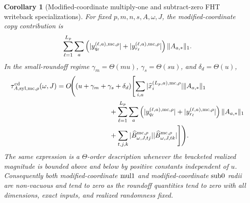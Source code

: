 \documentclass[11pt]{article}
\newtheorem{corollary}[theorem]{Corollary}
\theoremstyle{remark}
\begin{document}
\begin{corollary}[Modified-coordinate multiply-one and subtract-zero FHT writeback specializations]
For fixed \(p,m,n,s,A,\omega,J\), the modified-coordinate copy contribution is
\[
  \sum_{\ell=1}^{L_p}\sum_a
  \left(
    |y_{q_\ell}^{(\ell,a),{\rm mc},\rho}|
    +
    |y_{r_\ell}^{(\ell,a),{\rm mc},\rho}|
  \right)\|A_{a,*}\|_1 .
\]
In the small-roundoff regime
\(\gamma_m=\Theta(mu)\), \(\gamma_s=\Theta(su)\), and
\(\delta_d=\Theta(u)\),
\begin{align*}
  \tau_{A,{\rm syl},{\rm mc},\rho}^{\rm cd}(\omega,J)
  &=
  O\!\Biggl(
    (u+\gamma_m+\gamma_s+\delta_d)
    \Biggl[
      \sum_{i,a}
        |\widehat x_i^{(L_p,a),{\rm mc},\rho}|\|A_{a,*}\|_1\\
  &\hspace{2.7cm}
      +
      \sum_{\ell=1}^{L_p}\sum_a
        \left(
          |y_{q_\ell}^{(\ell,a),{\rm mc},\rho}|
          +
          |y_{r_\ell}^{(\ell,a),{\rm mc},\rho}|
        \right)\|A_{a,*}\|_1\\
  &\hspace{2.7cm}
      +
      \sum_{t,j,k}
        |\widehat B^{{\rm mc},\rho}_{\omega,J,tj}|
        |\widehat B^{{\rm mc},\rho}_{\omega,J,tk}|
    \Biggr]
  \Biggr).
\end{align*}
The same expression is a \(\Theta\)-order description whenever the bracketed
realized magnitude is bounded above and below by positive constants
independent of \(u\).  Consequently both modified-coordinate \({\rm mul1}\)
and modified-coordinate \({\rm sub0}\) radii are non-vacuous and tend to zero
as the roundoff quantities tend to zero with all dimensions, exact inputs, and
realized randomness fixed.


\end{corollary}
\end{document}
